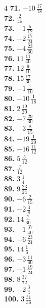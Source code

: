 \documentclass[11pt]{article}
\begin{document}
\begin{multicols}{4}
\textbf{71.} $-10\,\frac{17}{18}$\\
\textbf{72.} $\frac{2}{45}$\\
\textbf{73.} $-1\,\frac{5}{12}$\\
\textbf{74.} $-2\,\frac{17}{24}$\\
\textbf{75.} $-4\,\frac{23}{60}$\\
\textbf{76.} $11\,\frac{11}{40}$\\
\textbf{77.} $12\,\frac{9}{10}$\\
\textbf{78.} $15\,\frac{17}{30}$\\
\textbf{79.} $-1\,\frac{1}{10}$\\
\textbf{80.} $-10\,\frac{1}{18}$\\
\textbf{81.} $2\,\frac{19}{20}$\\
\textbf{82.} $-7\,\frac{29}{30}$\\
\textbf{83.} $-3\,\frac{8}{15}$\\
\textbf{84.} $-19\,\frac{1}{20}$\\
\textbf{85.} $-16\,\frac{11}{12}$\\
\textbf{86.} $5\,\frac{5}{12}$\\
\textbf{87.} $\frac{7}{12}$\\
\textbf{88.} $3\,\frac{1}{4}$\\
\textbf{89.} $9\,\frac{23}{24}$\\
\textbf{90.} $-6\,\frac{2}{15}$\\
\textbf{91.} $-2\,\frac{3}{8}$\\
\textbf{92.} $14\,\frac{7}{30}$\\
\textbf{93.} $-1\,\frac{37}{40}$\\
\textbf{94.} $-6\,\frac{23}{24}$\\
\textbf{95.} $14\,\frac{1}{6}$\\
\textbf{96.} $-3\,\frac{11}{60}$\\
\textbf{97.} $-1\,\frac{19}{24}$\\
\textbf{98.} $8\,\frac{37}{72}$\\
\textbf{99.} $-2\,\frac{3}{4}$\\
\textbf{100.} $3\,\frac{31}{36}$\\
\end{multicols}
\end{document}
